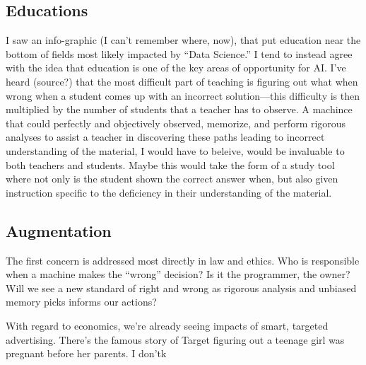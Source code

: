 \documentclass[11pt]{article}  %
\begin{document}
\begin{enumerate}
\begin{enumerate}
    \subsection{Educations}    
    I saw an info-graphic (I can't remember where, now), that put education near
    the bottom of fields most likely impacted by ``Data Science.''  I
    tend to instead agree with the idea that education is one of the key areas
    of opportunity for AI.  I've heard (source?) that the most difficult part of
    teaching is figuring out what when wrong when a student comes up with an incorrect
    solution---this difficulty is then multiplied by the number of students that
    a teacher has to observe.  A machince that could perfectly and
    objectively observed, memorize, and perform rigorous analyses to assist a
    teacher in discovering these paths leading to incorrect understanding of
    the material, I would have to beleive, would be invaluable to both teachers
    and students.  Maybe this would take the form of a study tool where not only
    is the student shown the correct answer when, but also given instruction
    specific to the deficiency in their understanding of the material.
    
   
    
    \subsection{Augmentation}
    
    The first concern is addressed most directly in law and ethics.  Who is
    responsible when a machine makes the ``wrong'' decision? Is it the
    programmer, the owner? Will we see a new standard of right and wrong as
    rigorous analysis and unbiased memory picks informs our actions? 
    \par
    With regard to economics, we're already seeing impacts of smart, targeted
    advertising.  There's the famous story of Target figuring out a teenage girl
    was pregnant before her parents.  I don'tk 
    \end{enumerate}
    \end{enumerate}
\end{document}
